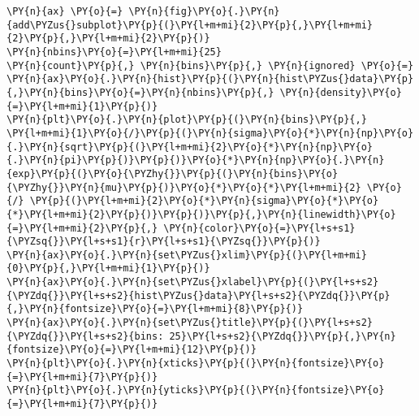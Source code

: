 \begin{tcolorbox}[breakable, size=fbox, boxrule=1pt, pad at break*=1mm,colback=cellbackground, colframe=cellborder]
\begin{Verbatim}[commandchars=\\\{\}]
\PY{n}{ax} \PY{o}{=} \PY{n}{fig}\PY{o}{.}\PY{n}{add\PYZus{}subplot}\PY{p}{(}\PY{l+m+mi}{2}\PY{p}{,}\PY{l+m+mi}{2}\PY{p}{,}\PY{l+m+mi}{2}\PY{p}{)}
\PY{n}{nbins}\PY{o}{=}\PY{l+m+mi}{25}
\PY{n}{count}\PY{p}{,} \PY{n}{bins}\PY{p}{,} \PY{n}{ignored} \PY{o}{=} \PY{n}{ax}\PY{o}{.}\PY{n}{hist}\PY{p}{(}\PY{n}{hist\PYZus{}data}\PY{p}{,}\PY{n}{bins}\PY{o}{=}\PY{n}{nbins}\PY{p}{,} \PY{n}{density}\PY{o}{=}\PY{l+m+mi}{1}\PY{p}{)}
\PY{n}{plt}\PY{o}{.}\PY{n}{plot}\PY{p}{(}\PY{n}{bins}\PY{p}{,} \PY{l+m+mi}{1}\PY{o}{/}\PY{p}{(}\PY{n}{sigma}\PY{o}{*}\PY{n}{np}\PY{o}{.}\PY{n}{sqrt}\PY{p}{(}\PY{l+m+mi}{2}\PY{o}{*}\PY{n}{np}\PY{o}{.}\PY{n}{pi}\PY{p}{)}\PY{p}{)}\PY{o}{*}\PY{n}{np}\PY{o}{.}\PY{n}{exp}\PY{p}{(}\PY{o}{\PYZhy{}}\PY{p}{(}\PY{n}{bins}\PY{o}{\PYZhy{}}\PY{n}{mu}\PY{p}{)}\PY{o}{*}\PY{o}{*}\PY{l+m+mi}{2} \PY{o}{/} \PY{p}{(}\PY{l+m+mi}{2}\PY{o}{*}\PY{n}{sigma}\PY{o}{*}\PY{o}{*}\PY{l+m+mi}{2}\PY{p}{)}\PY{p}{)}\PY{p}{,}\PY{n}{linewidth}\PY{o}{=}\PY{l+m+mi}{2}\PY{p}{,} \PY{n}{color}\PY{o}{=}\PY{l+s+s1}{\PYZsq{}}\PY{l+s+s1}{r}\PY{l+s+s1}{\PYZsq{}}\PY{p}{)}
\PY{n}{ax}\PY{o}{.}\PY{n}{set\PYZus{}xlim}\PY{p}{(}\PY{l+m+mi}{0}\PY{p}{,}\PY{l+m+mi}{1}\PY{p}{)}
\PY{n}{ax}\PY{o}{.}\PY{n}{set\PYZus{}xlabel}\PY{p}{(}\PY{l+s+s2}{\PYZdq{}}\PY{l+s+s2}{hist\PYZus{}data}\PY{l+s+s2}{\PYZdq{}}\PY{p}{,}\PY{n}{fontsize}\PY{o}{=}\PY{l+m+mi}{8}\PY{p}{)}
\PY{n}{ax}\PY{o}{.}\PY{n}{set\PYZus{}title}\PY{p}{(}\PY{l+s+s2}{\PYZdq{}}\PY{l+s+s2}{bins: 25}\PY{l+s+s2}{\PYZdq{}}\PY{p}{,}\PY{n}{fontsize}\PY{o}{=}\PY{l+m+mi}{12}\PY{p}{)}
\PY{n}{plt}\PY{o}{.}\PY{n}{xticks}\PY{p}{(}\PY{n}{fontsize}\PY{o}{=}\PY{l+m+mi}{7}\PY{p}{)}
\PY{n}{plt}\PY{o}{.}\PY{n}{yticks}\PY{p}{(}\PY{n}{fontsize}\PY{o}{=}\PY{l+m+mi}{7}\PY{p}{)}


\end{Verbatim}
\end{tcolorbox}
